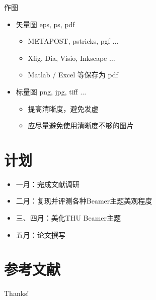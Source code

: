 \documentclass{beamer}
\begin{document}
\begin{frame}{作图}
    \begin{itemize}
        \item 矢量图 eps, ps, pdf
        \begin{itemize}
            \item METAPOST, pstricks, pgf $\ldots$
            \item Xfig, Dia, Visio, Inkscape $\ldots$
            \item Matlab / Excel 等保存为 pdf
        \end{itemize}
        \item 标量图 png, jpg, tiff $\ldots$
        \begin{itemize}
            \item 提高清晰度，避免发虚
            \item 应尽量避免使用清晰度不够的图片
        \end{itemize}
    \end{itemize}

\end{frame}

\section{计划}
\begin{frame}
    \begin{itemize}
        \item 一月：完成文献调研
        \item 二月：复现并评测各种Beamer主题美观程度
        \item 三、四月：美化THU Beamer主题
        \item 五月：论文撰写
    \end{itemize}
\end{frame}


\section{参考文献}
\begin{frame}[allowframebreaks]
    
    
\end{frame}

\begin{frame}
    \begin{center}
        {\Huge\calligra Thanks!}
    \end{center}
\end{frame}
\end{document}
